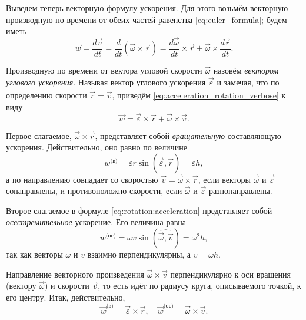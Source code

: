 \documentclass{article}
\theoremstyle{definition}
\theoremstyle{plain}
\theoremstyle{remark}
\numberwithin{equation}{section}
\newcommand{\crossprod}[2]{#1 \times #2}
\newcommand{\der}[2][]{\frac{d #1}{d #2}}
\newcommand{\dt}[1][]{\der[#1]{t}}
\begin{document}
Выведем теперь векторную формулу ускорения. Для этого возьмём векторную
производную по времени от обеих частей равенства \ref{eq:euler_formula}; будем
иметь
\begin{equation}
  \label{eq:acceleration_rotation_verbose}
  \vec{w} = \dt[\vec{v}] = \dt (\crossprod{\vec{\omega}}{\vec{r}}) =
    \crossprod{\dt[\vec{\omega}]}{\vec{r}} +
    \crossprod{\vec{\omega}}{\dt[\vec{r}]}.
\end{equation}

Производную по времени от вектора угловой скорости $\vec{\omega}$ назовём
\textit{вектором углового ускорения}. Называя вектор углового ускорения
$\vec{\varepsilon}$ и замечая, что по определению скорости $\dot{\vec{r}} =
\vec{v}$, приведём \ref{eq:acceleration_rotation_verbose} к виду
\begin{equation}
  \label{eq:rotation:acceleration}
  \vec{w} = \crossprod{\vec{\varepsilon}}{\vec{r}} +
    \crossprod{\vec{\omega}}{\vec{v}}.
\end{equation}

Первое слагаемое, $\crossprod{\vec{\omega}}{\vec{r}}$, представляет собой
\textit{вращательную} составляющую ускорения. Действительно, оно равно по
величине
\begin{equation*}
  w^{\text{(в)}} = \varepsilon r \sin(\widehat{\vec{\varepsilon}, \vec{r}})
    = \varepsilon h,
\end{equation*}
а по направлению совпадает со скоростью $\vec{v} =
\crossprod{\vec{\omega}}{\vec{r}}$, если векторы $\vec{\omega}$ и
$\vec{\varepsilon}$ сонаправлены, и противоположно скорости, если $\vec{\omega}$
и $\vec{\varepsilon}$ разнонаправлены.

Второе слагаемое в формуле \ref{eq:rotation:acceleration} представляет собой
\textit{осестремительное} ускорение. Его величина равна
\begin{equation*}
  w^{\text{(ос)}} = \omega v \sin(\widehat{\vec{\omega}, \vec{v}})
    = \omega^2 h,
\end{equation*}
так как векторы $\omega$ и $v$ взаимно перпендикулярны, а $v = \omega h$.

Направление векторного произведения $\crossprod{\vec{\omega}}{\vec{v}}$
перпендикулярно к оси вращения (вектору $\vec{\omega}$) и скорости $\vec{v}$, то
есть идёт по радиусу круга, описываемого точкой, к его центру. Итак,
действительно,
\begin{equation}
  \vec{w}^{\text{(в)}} = \crossprod{\vec{\varepsilon}}{\vec{r}}, \quad
    \vec{w}^{\text{(ос)}} = \crossprod{\vec{\omega}}{\vec{v}}.
\end{equation}
\end{document}
